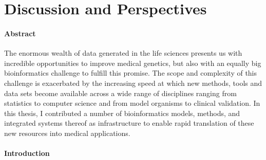 \chapter{Discussion and Perspectives}
\label{chap:discussion}

{ \Large {} }

\newpage

\subsubsection*{Abstract}

The enormous wealth of data generated in the life sciences presents us with incredible opportunities to improve medical genetics, but also with an equally big bioinformatics challenge to fulfill this promise.
The scope and complexity of this challenge is exacerbated by the increasing speed at which new methods, tools and data sets become available across a wide range of disciplines ranging from statistics to computer science and from model organisms to clinical validation.
In this thesis, I contributed a number of bioinformatics models, methods, and integrated systems thereof as infrastructure to enable rapid translation of these new resources into medical applications.

\subsubsection*{Introduction}

